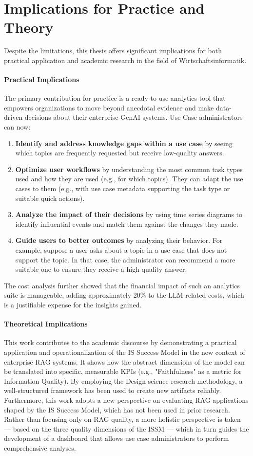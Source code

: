 \documentclass[
	english,
	ruledheaders=section,%
	class=report,%
	thesis={type=bachelor},%
	accentcolor=1b,%
	custommargins=true,%
	marginpar=false,%
	parskip=half-,%
	fontsize=11pt,%
	DIV=14,
]{tudapub}
\begin{document}
\section{Implications for Practice and Theory}
Despite the limitations, this thesis offers significant implications for both practical application and academic research in the field of Wirtschaftsinformatik.

\paragraph{Practical Implications} The primary contribution for practice is a ready-to-use analytics tool that empowers organizations to move beyond anecdotal evidence and make data-driven decisions about their enterprise GenAI systems. Use Case administrators can now:
\begin{enumerate}
    \item \textbf{Identify and address knowledge gaps within a use case} by seeing which topics are frequently requested but receive low-quality answers.
    \item \textbf{Optimize user workflows} by understanding the most common task types used and how they are used (e.g., for which topics). They can adapt the use cases to them (e.g., with use case metadata supporting the task type or suitable quick actions).
    \item \textbf{Analyze the impact of their decisions} by using time series diagrams to identify influential events and match them against the changes they made.
    \item \textbf{Guide users to better outcomes} by analyzing their behavior. For example, suppose a user asks about a topic in a use case that does not support the topic. In that case, the administrator can recommend a more suitable one to ensure they receive a high-quality answer.
\end{enumerate}
The cost analysis further showed that the financial impact of such an analytics suite is manageable, adding approximately 20\% to the LLM-related costs, which is a justifiable expense for the insights gained.

\paragraph{Theoretical Implications} This work contributes to the academic discourse by demonstrating a practical application and operationalization of the IS Success Model in the new context of enterprise RAG systems. It shows how the abstract dimensions of the model can be translated into specific, measurable KPIs (e.g., "Faithfulness" as a metric for Information Quality). By employing the Design science research methodology, a well-structured framework has been used to create new artifacts reliably. Furthermore, this work adopts a new perspective on evaluating RAG applications shaped by the IS Success Model, which has not been used in prior research. Rather than focusing only on RAG quality, a more holistic perspective is taken — based on the three quality dimensions of the ISSM — which in turn guides the development of a dashboard that allows use case administrators to perform comprehensive analyses.
\end{document}
